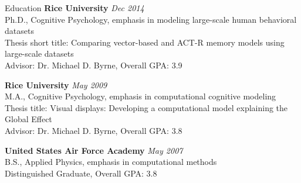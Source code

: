  
\begin{rSection}{Education}
  {\bf Rice University} \hfill {\em Dec 2014} \\
  Ph.D., Cognitive Psychology, emphasis in modeling large-scale human behavioral datasets \\
  Thesis short title: Comparing vector-based and ACT-R memory models using large-scale datasets \\
  Advisor: Dr. Michael D. Byrne, Overall GPA: 3.9
\item {\bf Rice University} \hfill {\em May 2009} \\ 
  M.A., Cognitive Psychology, emphasis in computational cognitive modeling \\
  Thesis title: Visual displays: Developing a computational model explaining the Global Effect \\
  Advisor: Dr. Michael D. Byrne, Overall GPA: 3.8
\item {\bf United States Air Force Academy} \hfill {\em May 2007} \\ 
  B.S., Applied Physics, emphasis in computational methods \\
  Distinguished Graduate, Overall GPA: 3.8 
\end{rSection}

